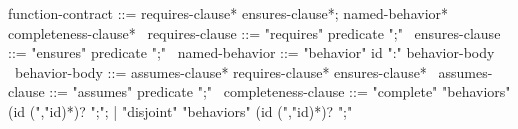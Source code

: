 \begin{syntax}
  function-contract ::= requires-clause* ensures-clause*;
                        named-behavior* completeness-clause*
  \
  requires-clause ::= "requires" predicate ";"
  \
  ensures-clause ::= "ensures" predicate ";"
  \
  named-behavior ::= "behavior" id ":" behavior-body
  \
  behavior-body ::= assumes-clause* requires-clause* ensures-clause*
  \
  assumes-clause ::= "assumes" predicate ";"
  \
  completeness-clause ::= "complete" "behaviors" (id (","id)*)? ";";
     | "disjoint" "behaviors" (id (","id)*)? ";"
\end{syntax}
